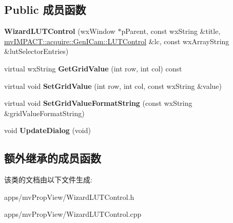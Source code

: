 \subsection*{Public 成员函数}
\begin{DoxyCompactItemize}
\item 
\hypertarget{class_wizard_l_u_t_control_af7cb2883b764472ddbab03e534c9f44c}{{\bfseries Wizard\+L\+U\+T\+Control} (wx\+Window $\ast$p\+Parent, const wx\+String \&title, \hyperlink{classmv_i_m_p_a_c_t_1_1acquire_1_1_gen_i_cam_1_1_l_u_t_control}{mv\+I\+M\+P\+A\+C\+T\+::acquire\+::\+Gen\+I\+Cam\+::\+L\+U\+T\+Control} \&lc, const wx\+Array\+String \&lut\+Selector\+Entries)}\label{class_wizard_l_u_t_control_af7cb2883b764472ddbab03e534c9f44c}

\item 
\hypertarget{class_wizard_l_u_t_control_a288dcc39e46c19bbe6da6f78c7678f6a}{virtual wx\+String {\bfseries Get\+Grid\+Value} (int row, int col) const }\label{class_wizard_l_u_t_control_a288dcc39e46c19bbe6da6f78c7678f6a}

\item 
\hypertarget{class_wizard_l_u_t_control_a6089d39425e7d45b9080e330d5343da3}{virtual void {\bfseries Set\+Grid\+Value} (int row, int col, const wx\+String \&value)}\label{class_wizard_l_u_t_control_a6089d39425e7d45b9080e330d5343da3}

\item 
\hypertarget{class_wizard_l_u_t_control_a2e7caa3d9a4df1b1c0a9410c04247282}{virtual void {\bfseries Set\+Grid\+Value\+Format\+String} (const wx\+String \&grid\+Value\+Format\+String)}\label{class_wizard_l_u_t_control_a2e7caa3d9a4df1b1c0a9410c04247282}

\item 
\hypertarget{class_wizard_l_u_t_control_a0072010ee1c3d8df52eaef5410da61e9}{void {\bfseries Update\+Dialog} (void)}\label{class_wizard_l_u_t_control_a0072010ee1c3d8df52eaef5410da61e9}

\end{DoxyCompactItemize}
\subsection*{额外继承的成员函数}


该类的文档由以下文件生成\+:\begin{DoxyCompactItemize}
\item 
apps/mv\+Prop\+View/Wizard\+L\+U\+T\+Control.\+h\item 
apps/mv\+Prop\+View/Wizard\+L\+U\+T\+Control.\+cpp\end{DoxyCompactItemize}
